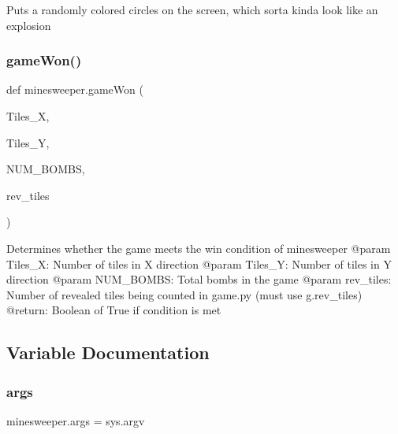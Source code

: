 \begin{DoxyVerb}Puts a randomly colored circles on the screen, which sorta kinda look like an explosion
\end{DoxyVerb}
 \mbox{\label{namespaceminesweeper_a2be5f774bd929fda843bb947c8204607}} 
\subsubsection{\texorpdfstring{gameWon()}{gameWon()}}
{\footnotesize\ttfamily def minesweeper.\+game\+Won (\begin{DoxyParamCaption}\item[{}]{Tiles\+\_\+X,  }\item[{}]{Tiles\+\_\+Y,  }\item[{}]{N\+U\+M\+\_\+\+B\+O\+M\+BS,  }\item[{}]{rev\+\_\+tiles }\end{DoxyParamCaption})}

\begin{DoxyVerb}Determines whether the game meets the win condition of minesweeper
@param Tiles_X: Number of tiles in X direction
@param Tiles_Y: Number of tiles in Y direction
@param NUM_BOMBS: Total bombs in the game
@param rev_tiles: Number of revealed tiles being counted in game.py (must use g.rev_tiles)
@return: Boolean of True if condition is met
\end{DoxyVerb}
 

\subsection{Variable Documentation}
\mbox{\label{namespaceminesweeper_a85659bd28c6c730dfc76bd09939251e6}} 
\subsubsection{\texorpdfstring{args}{args}}
{\footnotesize\ttfamily minesweeper.\+args = sys.\+argv}

\mbox{\label{namespaceminesweeper_a3324cf634218bea0300a16ea394866bf}} 
